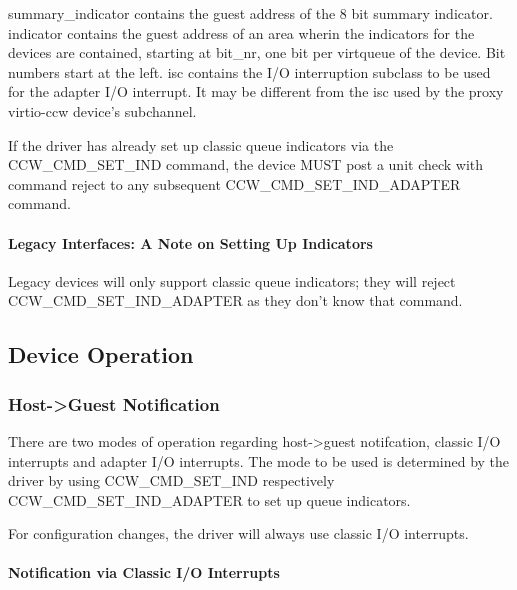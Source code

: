 summary_indicator contains the guest address of the 8 bit summary
indicator.
indicator contains the guest address of an area wherin the indicators
for the devices are contained, starting at bit_nr, one bit per
virtqueue of the device. Bit numbers start at the left.
isc contains the I/O interruption subclass to be used for the adapter
I/O interrupt. It may be different from the isc used by the proxy
virtio-ccw device's subchannel.

If the driver has already set up classic queue indicators via the
CCW_CMD_SET_IND command, the device MUST post a unit check with
command reject to any subsequent CCW_CMD_SET_IND_ADAPTER command.

\paragraph{Legacy Interfaces: A Note on Setting Up Indicators}\label{sec:Virtio Transport Options / Virtio over channel I/O / Device Initialization / Setting Up Indicators / Legacy Interfaces: A Note on Setting Up Indicators}

Legacy devices will only support classic queue indicators; they will
reject CCW_CMD_SET_IND_ADAPTER as they don't know that command.

\subsection{Device Operation}\label{sec:Virtio Transport Options / Virtio over channel I/O / Device Operation}

\subsubsection{Host->Guest Notification}\label{sec:Virtio Transport Options / Virtio over channel I/O / Device Operation / Host->Guest Notification}

There are two modes of operation regarding host->guest notifcation,
classic I/O interrupts and adapter I/O interrupts. The mode to be
used is determined by the driver by using CCW_CMD_SET_IND respectively
CCW_CMD_SET_IND_ADAPTER to set up queue indicators.

For configuration changes, the driver will always use classic I/O
interrupts.

\paragraph{Notification via Classic I/O Interrupts}\label{sec:Virtio Transport Options / Virtio over channel I/O / Device Operation / Host->Guest Notification / Notification via Classic I/O Interrupts}

